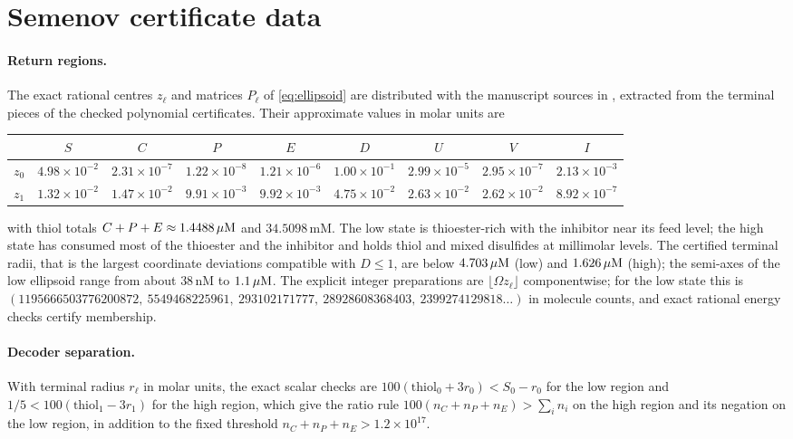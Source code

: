 \section{Semenov certificate data}\label{app:semenov}

\paragraph{Return regions.}
The exact rational centres $z_\ell$ and matrices $P_\ell$ of \eqref{eq:ellipsoid} are distributed with the manuscript sources in , extracted from the terminal pieces of the checked polynomial certificates. Their approximate values in molar units are
\begin{center}\footnotesize\setlength{\tabcolsep}{3.5pt}
\begin{tabular}{@{}lcccccccc@{}}\toprule
 & $S$ & $C$ & $P$ & $E$ & $D$ & $U$ & $V$ & $I$\\\midrule
$z_0$ & $4.98\times10^{-2}$ & $2.31\times10^{-7}$ & $1.22\times10^{-8}$ & $1.21\times10^{-6}$ & $1.00\times10^{-1}$ & $2.99\times10^{-5}$ & $2.95\times10^{-7}$ & $2.13\times10^{-3}$\\
$z_1$ & $1.32\times10^{-2}$ & $1.47\times10^{-2}$ & $9.91\times10^{-3}$ & $9.92\times10^{-3}$ & $4.75\times10^{-2}$ & $2.63\times10^{-2}$ & $2.62\times10^{-2}$ & $8.92\times10^{-7}$\\
\bottomrule
\end{tabular}
\end{center}
with thiol totals $C+P+E\approx1.4488\,\mu\mathrm{M}$ and $34.5098$\,mM. The low state is thioester-rich with the inhibitor near its feed level; the high state has consumed most of the thioester and the inhibitor and holds thiol and mixed disulfides at millimolar levels. The certified terminal radii, that is the largest coordinate deviations compatible with $D\le1$, are below $4.703\,\mu\mathrm{M}$ (low) and $1.626\,\mu\mathrm{M}$ (high); the semi-axes of the low ellipsoid range from about $38$\,nM to $1.1\,\mu\mathrm{M}$. The explicit integer preparations are $\lfloor\Omega z_\ell\rfloor$ componentwise; for the low state this is $(1195666503776200872,\ 5549468225961,\ 293102171777,\ 28928608368403,\ 2399274129818\ldots)$ in molecule counts, and exact rational energy checks certify membership.

\paragraph{Decoder separation.}
With terminal radius $r_\ell$ in molar units, the exact scalar checks are $100(\text{thiol}_0+3r_0)<S_0-r_0$ for the low region and $1/5<100(\text{thiol}_1-3r_1)$ for the high region, which give the ratio rule $100(n_C+n_P+n_E)>\sum_in_i$ on the high region and its negation on the low region, in addition to the fixed threshold $n_C+n_P+n_E>1.2\times10^{17}$.

